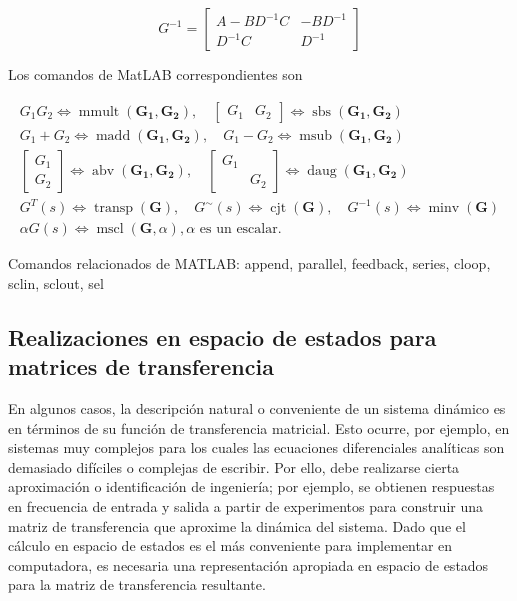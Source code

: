 \documentclass[11pt]{article}
\begin{document}
$$
G^{-1}=\left[\begin{array}{c|c}
A-B D^{-1} C & -B D^{-1} \\
\hline D^{-1} C & D^{-1}
\end{array}\right]
$$

Los comandos de MatLAB correspondientes son

$$
\begin{gathered}
G_{1} G_{2} \Longleftrightarrow \operatorname{mmult}\left(\mathbf{G}_{\mathbf{1}}, \mathbf{G}_{\mathbf{2}}\right), \quad\left[\begin{array}{ll}
G_{1} & G_{2}
\end{array}\right] \Longleftrightarrow \operatorname{sbs}\left(\mathbf{G}_{\mathbf{1}}, \mathbf{G}_{\mathbf{2}}\right) \\
G_{1}+G_{2} \Longleftrightarrow \operatorname{madd}\left(\mathbf{G}_{\mathbf{1}}, \mathbf{G}_{\mathbf{2}}\right), \quad G_{1}-G_{2} \Longleftrightarrow \operatorname{msub}\left(\mathbf{G}_{\mathbf{1}}, \mathbf{G}_{\mathbf{2}}\right) \\
{\left[\begin{array}{l}
G_{1} \\
G_{2}
\end{array}\right] \Longleftrightarrow \operatorname{abv}\left(\mathbf{G}_{\mathbf{1}}, \mathbf{G}_{\mathbf{2}}\right), \quad\left[\begin{array}{cc}
G_{1} & \\
& G_{2}
\end{array}\right] \Longleftrightarrow \operatorname{daug}\left(\mathbf{G}_{\mathbf{1}}, \mathbf{G}_{\mathbf{2}}\right)} \\
G^{T}(s) \Longleftrightarrow \operatorname{transp}(\mathbf{G}), \quad G^{\sim}(s) \Longleftrightarrow \operatorname{cjt}(\mathbf{G}), \quad G^{-1}(s) \Longleftrightarrow \operatorname{minv}(\mathbf{G}) \\
\alpha G(s) \Longleftrightarrow \operatorname{mscl}(\mathbf{G}, \alpha), \alpha \text { es un escalar. }
\end{gathered}
$$

Comandos relacionados de MATLAB: append, parallel, feedback, series, cloop, sclin, sclout, sel

\subsection*{Realizaciones en espacio de estados para matrices de transferencia}
En algunos casos, la descripción natural o conveniente de un sistema dinámico es en términos de su función de transferencia matricial. Esto ocurre, por ejemplo, en sistemas muy complejos para los cuales las ecuaciones diferenciales analíticas son demasiado difíciles o complejas de escribir. Por ello, debe realizarse cierta aproximación o identificación de ingeniería; por ejemplo, se obtienen respuestas en frecuencia de entrada y salida a partir de experimentos para construir una matriz de transferencia que aproxime la dinámica del sistema. Dado que el cálculo en espacio de estados es el más conveniente para implementar en computadora, es necesaria una representación apropiada en espacio de estados para la matriz de transferencia resultante.
\end{document}
